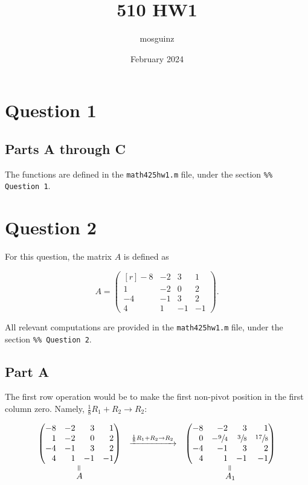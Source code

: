 \documentclass[12pt]{article}
\title{510 HW1}
\author{mosguinz}
\date{February 2024}
\newcommand{\veq}{\mathrel{\rotatebox{90}{$=$}}}
\newcommand{\code}[1]{\texttt{#1}}
\begin{document}
\section*{Question 1}

\subsection*{Parts A through C}

The functions are defined in the \code{math425hw1.m} file, under the section \code{\%\% Question 1}.

\section*{Question 2}

For this question, the matrix $A$ is defined as

$$
A = \begin{pmatrix*}[r]
    -8 & -2 & 3 & 1 \\
    1 & -2 &  0  & 2 \\
    -4 & -1 & 3 & 2 \\
    4 & 1 & -1 & -1
\end{pmatrix*}.
$$

All relevant computations are provided in the \code{math425hw1.m} file, under the section \code{\%\% Question 2}.

\subsection*{Part A}

The first row operation would be to make the first non-pivot position in the first column zero. Namely, $\frac{1}{8}R_1 + R_2 \to R_2$:

$$
\begin{array}{ccc}
    \begin{pmatrix*}[r]
        -8 & -2 & 3 & 1 \\
        1 & -2 &  0  & 2 \\
        -4 & -1 & 3 & 2 \\
        4 & 1 & -1 & -1
    \end{pmatrix*}
    &\xrightarrow{\frac{1}{8}R_1 + R_2 \to R_2}
    &\begin{pmatrix*}[r]
        -8 & -2 & 3 & 1 \\
        0 & -\sfrac{9}{4} & \sfrac{3}{8}  & \sfrac{17}{8} \\
        -4 & -1 & 3 & 2 \\
        4 & 1 & -1 & -1
    \end{pmatrix*}
    \\
    \overset{\veq}{A} & & \overset{\veq}{A_1}
\end{array}
$$
\end{document}
